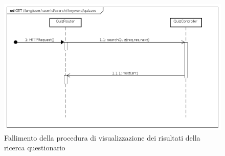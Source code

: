 \begin{itemize}
\begin{figure}[ht]
	\centering
	\includegraphics[scale=0.45]{UML/DiagrammiDiSequenza/Back-end/GET__lang_user__userId_search__keyword_quizzes_failure.png}
	\caption{Fallimento della procedura di visualizzazione dei risultati della ricerca questionario}
\end{figure}
\FloatBarrier
\end{itemize}

